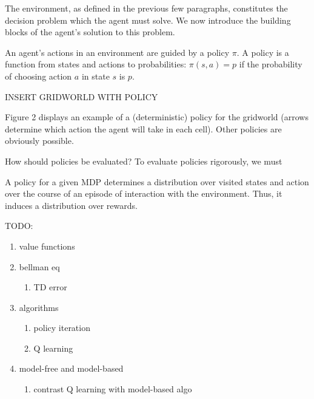 The environment, as defined in the previous few paragraphs, constitutes the decision problem which the agent must solve.
We now introduce the building blocks of the agent's solution to this problem.

An agent's actions in an environment are guided by a policy $\pi$.
A policy is a function from states and actions to probabilities: $\pi(s, a) = p$ if the probability of choosing action $a$ in state $s$ is $p$.
\begin{center}
	INSERT GRIDWORLD WITH POLICY
\end{center}
Figure 2 displays an example of a (deterministic) policy for the gridworld (arrows determine which action the agent will take in each cell).
Other policies are obviously possible.

How should policies be evaluated?
To evaluate policies rigorously, we must 


A policy for a given MDP determines a distribution over visited states and action over the course of an episode of interaction with the environment.
Thus, it induces a distribution over rewards.


TODO:
\begin{enumerate}
	\item value functions
	\item bellman eq
		\begin{enumerate}
			\item TD error
		\end{enumerate}
	\item algorithms
		\begin{enumerate}
			\item policy iteration
			\item Q learning
		\end{enumerate}
	\item model-free and model-based
		\begin{enumerate}
			\item contrast Q learning with model-based algo
		\end{enumerate}
\end{enumerate}

